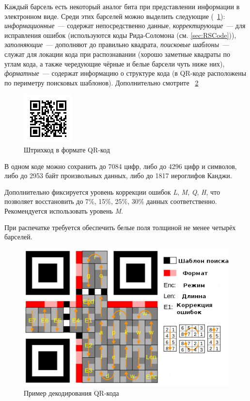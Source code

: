 Каждый барсель есть некоторый 
аналог бита при представлении информации в электронном виде. Среди этих
барселей можно выделить следующие (\figurename\ \ref{fig:qrSimple}): 
\textit{информационные}~--- содержат 
непосредственно данные, \textit{корректирующие}~--- для исправления ошибок
(используются коды Рида-Соломона (см. \ref{sec:RSCode})), 
\textit{заполняющие}~---
дополняют до правильно квадрата, \textit{поисковые шаблоны}~--- 
служат для локации кода при распознавании (хорошо заметные квадраты по 
углам кода, а также чередующие чёрные и белые барсели чуть ниже них), 
\textit{форматные}~--- содержат информацию о структуре кода (в QR-коде 
расположены по периметру поисковых шаблонов). Дополнительно смотрите 
\figurename\ \ref{fig:qrDecode}

\begin{figure}[h]
    \centering
    \includegraphics{img/qr_sample}
    \caption{Штрихкод в формате QR-код}
    \label{fig:qrSimple}
\end{figure}

В одном коде можно сохранить до 7084 цифр, либо до 4296 цифр и символов,
либо до 2953 байт произвольных данных, либо до 1817 иероглифов Канджи.

Дополнительно фиксируется уровень коррекции ошибок \textit{L}, 
\textit{M}, \textit{Q}, \textit{H}, что
позволяет восстановить до 7\%, 15\%, 25\%, 30\% данных соответственно.
Рекомендуется использовать уровень \textit{M}.

При распечатке требуется обеспечить белые поля толщиной не менее четырёх
барселей.

\begin{figure}[htb]
    \centering
    \includegraphics[scale=0.5]{img/qr_decode}
    \caption{Пример декодирования QR-кода}
    \label{fig:qrDecode}
\end{figure}


